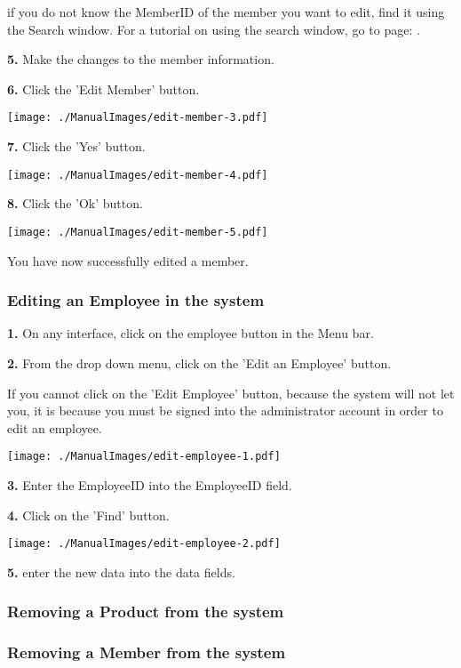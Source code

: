 if you do not know the MemberID of the member you want to edit, find it using the Search window. For a tutorial on using the search window, go to page: . 

\textbf{5.} Make the changes to the member information.

\textbf{6.}  Click the 'Edit Member' button.

\texttt{[image: ./ManualImages/edit-member-3.pdf]}

\textbf{7.}  Click the 'Yes' button.

\texttt{[image: ./ManualImages/edit-member-4.pdf]}

\textbf{8.} Click the 'Ok' button.

\texttt{[image: ./ManualImages/edit-member-5.pdf]}

You have now successfully edited a member.

\pagebreak
\subsubsection{Editing an Employee in the system}
\label{fig:Editing an Employee in the system}

\textbf{1.} On any interface, click on the employee button in the Menu bar.

\textbf{2.} From the drop down menu, click on the 'Edit an Employee' button.

If you cannot click on the 'Edit Employee' button, because the system will not let you, it is because you must be signed into the administrator account in order to edit an employee.

\texttt{[image: ./ManualImages/edit-employee-1.pdf]}

\textbf{3.} Enter the EmployeeID into the EmployeeID field.

\textbf{4.} Click on the 'Find' button.

\texttt{[image: ./ManualImages/edit-employee-2.pdf]}

\textbf{5.} enter the new data into the data fields.

\pagebreak
\subsubsection{Removing a Product from the system}
\label{fig:Removing a Product from the system}


\pagebreak
\subsubsection{Removing a Member from the system}
\label{fig:Removing a Member from the system}


